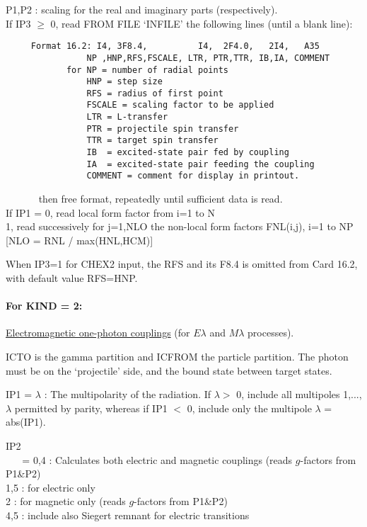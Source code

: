 \documentclass[11pt]{article}
\begin{document}
\begin{description}
 P1,P2 : scaling for the real and imaginary parts (respectively).\\

   If IP3 $\geq$  0, read FROM FILE `INFILE'  the following lines
   (until a blank line):
\begin{verbatim}
     Format 16.2: I4, 3F8.4,          I4,  2F4.0,   2I4,   A35
                NP ,HNP,RFS,FSCALE, LTR, PTR,TTR, IB,IA, COMMENT
            for NP = number of radial points
                HNP = step size
                RFS = radius of first point
                FSCALE = scaling factor to be applied
                LTR = L-transfer
                PTR = projectile spin transfer
                TTR = target spin transfer
                IB  = excited-state pair fed by coupling
                IA  = excited-state pair feeding the coupling
                COMMENT = comment for display in printout.
\end{verbatim}
    ~~~~~~ then free format, repeatedly until sufficient data is read.\\


 If IP1 =
      0, read local form factor from i=1 to N
\\  1, read successively for j=1,NLO the non-local form factors
 FNL(i,j), i=1 to NP   [NLO = RNL / max(HNL,HCM)]


When IP3=1 for CHEX2 input, the RFS and its F8.4 is omitted from Card 16.2,
with default value RFS=HNP.


\paragraph{For KIND = 2:}
\underline{Electromagnetic one-photon couplings} (for $E\lambda$ and
$M\lambda$ processes).



 ICTO is the gamma partition and ICFROM the particle partition.
 The photon must be on the `projectile' side, and the bound state between
 target states.

 IP1 = $\lambda$ : The multipolarity of the radiation.
 If $\lambda >$ 0, include all multipoles 1,...,$\lambda$
permitted by parity, whereas if IP1 $<$ 0, include only the multipole
$\lambda$ = abs(IP1).
%

IP2\\
~ ~   = 0,4 : Calculates both electric and magnetic couplings
(reads $g$-factors from P1\&P2)
\\    1,5 : for electric only
\\    2 : for magnetic only (reads $g$-factors from P1\&P2)
\\    4,5 : include also Siegert remnant for electric transitions



\end{description}
\end{document}
